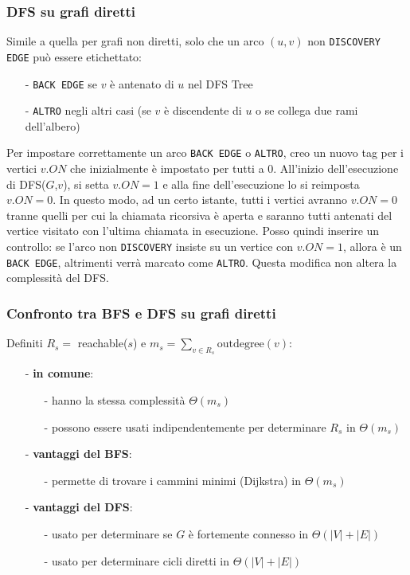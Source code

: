 \documentclass[a4paper]{article}
\begin{document}
\subsubsection*{DFS su grafi diretti}
Simile a quella per grafi non diretti, solo che un arco \((u,v)\) non \verb|DISCOVERY EDGE| può essere etichettato:
\begin{itemize}[topsep=3pt, itemsep=0pt]
	\item[-] \verb|BACK EDGE| se \(v\) è antenato di \(u\) nel DFS Tree
	\item[-] \verb|ALTRO| negli altri casi (se \(v\) è discendente di \(u\) o se collega due rami dell'albero)
\end{itemize}
Per impostare correttamente un arco \verb|BACK EDGE| o \verb|ALTRO|, creo un nuovo tag per i vertici \(v.ON\) che inizialmente è
impostato per tutti a 0. All'inizio dell'esecuzione di DFS(\(G\),\(v\)), si setta \(v.ON = 1\) e alla fine dell'esecuzione lo si
reimposta \(v.ON = 0\). In questo modo, ad un certo istante, tutti i vertici avranno \(v.ON = 0\) tranne quelli per cui la chiamata
ricorsiva è aperta e saranno tutti antenati del vertice visitato con l'ultima chiamata in esecuzione. Posso quindi inserire un
controllo: se l'arco non \verb|DISCOVERY| insiste su un vertice con \(v.ON = 1\), allora è un \verb|BACK EDGE|, altrimenti verrà
marcato come \verb|ALTRO|. Questa modifica non altera la complessità del DFS.

\subsubsection*{Confronto tra BFS e DFS su grafi diretti}
Definiti \(R_s = \) reachable(\(s\)) e \(m_s = \sum_{v \in R_s} \text{outdegree}(v)\):
\begin{itemize}[topsep=3pt, itemsep=0pt]
	\item[-] \textbf{in comune}:
	\begin{itemize}[topsep=0pt, itemsep=0pt]
		\item[-] hanno la stessa complessità \(\Theta(m_s)\)
		\item[-] possono essere usati indipendentemente per determinare \(R_s\) in \(\Theta(m_s)\)
	\end{itemize}
	\item[-] \textbf{vantaggi del BFS}:
	\begin{itemize}[topsep=0pt, itemsep=0pt]
		\item[-] permette di trovare i cammini minimi (Dijkstra) in \(\Theta(m_s)\)
	\end{itemize}
	\item[-] \textbf{vantaggi del DFS}:
	\begin{itemize}[topsep=0pt, itemsep=0pt]
		\item[-] usato per determinare se \(G\) è fortemente connesso in \(\Theta(|V|+|E|)\)
		\item[-] usato per determinare cicli diretti in \(\Theta(|V|+|E|)\)
	\end{itemize}
\end{itemize}
\end{document}
